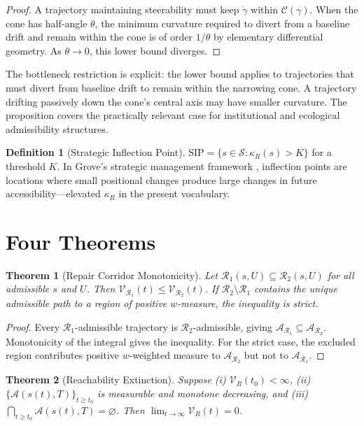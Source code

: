 \documentclass[12pt, a4paper]{article}
\theoremstyle{plain}
\newtheorem{theorem}{Theorem}
\theoremstyle{definition}
\newtheorem{definition}{Definition}
\theoremstyle{remark}
\begin{document}
\begin{proof}
A trajectory maintaining steerability must keep $\dot{\gamma}$ within $\mathcal{C}(\gamma)$. When the cone has half-angle $\theta$, the minimum curvature required to divert from a baseline drift and remain within the cone is of order $1/\theta$ by elementary differential geometry. As $\theta \to 0$, this lower bound diverges.
\end{proof}

The bottleneck restriction is explicit: the lower bound applies to trajectories that must divert from baseline drift to remain within the narrowing cone. A trajectory drifting passively down the cone's central axis may have smaller curvature. The proposition covers the practically relevant case for institutional and ecological admissibility structures.

\begin{definition}[Strategic Inflection Point]
$\mathrm{SIP} = \{s \in \mathcal{S} : \kappa_R(s) > K\}$ for a threshold $K$. In Grove's strategic management framework \cite{grove1996}, inflection points are locations where small positional changes produce large changes in future accessibility---elevated $\kappa_R$ in the present vocabulary.
\end{definition}

\section{Four Theorems}

\begin{theorem}[Repair Corridor Monotonicity]
\label{thm:monotonicity}
Let $\mathcal{R}_1(s,U) \subseteq \mathcal{R}_2(s,U)$ for all admissible $s$ and $U$. Then $\mathcal{V}_{\mathcal{R}_1}(t) \leq \mathcal{V}_{\mathcal{R}_2}(t)$. If $\mathcal{R}_2 \setminus \mathcal{R}_1$ contains the unique admissible path to a region of positive $w$-measure, the inequality is strict.
\end{theorem}

\begin{proof}
Every $\mathcal{R}_1$-admissible trajectory is $\mathcal{R}_2$-admissible, giving $\mathcal{A}_{\mathcal{R}_1} \subseteq \mathcal{A}_{\mathcal{R}_2}$. Monotonicity of the integral gives the inequality. For the strict case, the excluded region contributes positive $w$-weighted measure to $\mathcal{A}_{\mathcal{R}_2}$ but not to $\mathcal{A}_{\mathcal{R}_1}$.
\end{proof}

\begin{theorem}[Reachability Extinction]
\label{thm:extinction}
Suppose (i) $\mathcal{V}_R(t_0) < \infty$, (ii) $\{\mathcal{A}(s(t),T)\}_{t \geq t_0}$ is measurable and monotone decreasing, and (iii) $\bigcap_{t \geq t_0} \mathcal{A}(s(t),T) = \varnothing$. Then $\lim_{t \to \infty} \mathcal{V}_R(t) = 0$.
\end{theorem}
\end{document}
